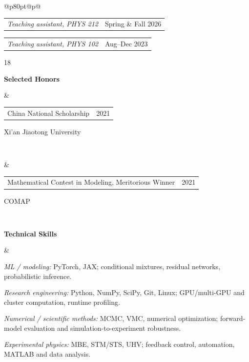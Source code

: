 \documentclass[11pt,letterpaper]{article}
\makeatletter
\newcommand{\datedline}[2]{%
  \begin{tabularx}{\linewidth}{@{}>{\raggedright\arraybackslash}Xr@{}}#1&{\small\sffamily\color{quietgray}#2}\end{tabularx}\par\nobreak}
\newcommand{\cvrow}[3]{%
  {\raggedright\small\sffamily\bfseries\color{sectiontone}#1\par}&%
  \begin{minipage}[t]{\linewidth}\raggedright #2\end{minipage}\\\noalign{\vskip #3pt}}
\makeatother
\begin{document}
\begin{longtable}{@{}p{80pt}@{\hspace{14pt}}p{\dimexpr\textwidth-94pt\relax}@{}}
{\datedline{\textit{Teaching assistant, PHYS 212}}{Spring \& Fall 2026}
\datedline{\textit{Teaching assistant, PHYS 102}}{Aug--Dec 2023}}{18}
\cvrow{Selected Honors}{\datedline{China National Scholarship}{2021}
Xi'an Jiaotong University\par}{10}
\cvrow{}{\datedline{Mathematical Contest in Modeling, Meritorious Winner}{2021}
COMAP\par}{18}
\cvrow{Technical Skills}{\textit{ML / modeling:} PyTorch, JAX; conditional mixtures, residual networks, probabilistic inference.\par
\textit{Research engineering:} Python, NumPy, SciPy, Git, Linux; GPU/multi-GPU and cluster computation, runtime profiling.\par
\textit{Numerical / scientific methods:} MCMC, VMC, numerical optimization; forward-model evaluation and simulation-to-experiment robustness.\par
\textit{Experimental physics:} MBE, STM/STS, UHV; feedback control, automation, MATLAB and data analysis.\par}{18}
\end{longtable}
\end{document}
